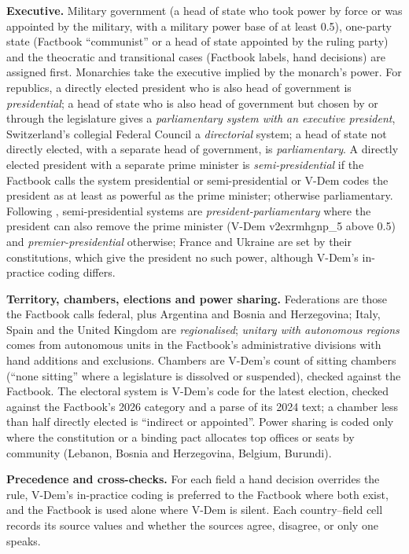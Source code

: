 \documentclass[11pt,a4paper]{article}
\begin{document}
\textbf{Executive.} Military government (a head of state who took power by force or was appointed by the military, with a military power base of at least 0.5), one-party state (Factbook ``communist'' or a head of state appointed by the ruling party) and the theocratic and transitional cases (Factbook labels, hand decisions) are assigned first. Monarchies take the executive implied by the monarch's power. For republics, a directly elected president who is also head of government is \emph{presidential}; a head of state who is also head of government but chosen by or through the legislature gives a \emph{parliamentary system with an executive president}, Switzerland's collegial Federal Council a \emph{directorial} system; a head of state not directly elected, with a separate head of government, is \emph{parliamentary}. A directly elected president with a separate prime minister is \emph{semi-presidential} if the Factbook calls the system presidential or semi-presidential or V-Dem codes the president as at least as powerful as the prime minister; otherwise parliamentary. Following \citet{shugartcarey}, semi-presidential systems are \emph{president-parliamentary} where the president can also remove the prime minister (V-Dem v2exrmhgnp\_5 above 0.5) and \emph{premier-presidential} otherwise; France and Ukraine are set by their constitutions, which give the president no such power, although V-Dem's in-practice coding differs.

\textbf{Territory, chambers, elections and power sharing.} Federations are those the Factbook calls federal, plus Argentina and Bosnia and Herzegovina; Italy, Spain and the United Kingdom are \emph{regionalised}; \emph{unitary with autonomous regions} comes from autonomous units in the Factbook's administrative divisions with hand additions and exclusions. Chambers are V-Dem's count of sitting chambers (``none sitting'' where a legislature is dissolved or suspended), checked against the Factbook. The electoral system is V-Dem's code for the latest election, checked against the Factbook's 2026 category and a parse of its 2024 text; a chamber less than half directly elected is ``indirect or appointed''. Power sharing is coded only where the constitution or a binding pact allocates top offices or seats by community (Lebanon, Bosnia and Herzegovina, Belgium, Burundi).

\textbf{Precedence and cross-checks.} For each field a hand decision overrides the rule, V-Dem's in-practice coding is preferred to the Factbook where both exist, and the Factbook is used alone where V-Dem is silent. Each country--field cell records its source values and whether the sources agree, disagree, or only one speaks.
\end{document}

